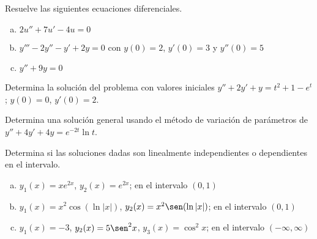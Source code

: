 \documentclass[12pt]{exam}
\begin{document}
\begin{questions}
     \question%
     Resuelve las siguientes ecuaciones diferenciales.
     \begin{enumerate}[a)]
         \item $2u''+7u'-4u=0$
         \item $y'''-2y''-y'+2y=0$ con $y(0)=2$, $y'(0)=3$ y $y''(0)=5$
         \item $y''+9y=0$
     \end{enumerate}

     \question%
     Determina la solución del problema con valores iniciales $y''+2y'+y=t^2+1-e^t$;  $y(0)=0$,  $y'(0)=2$.
     
     \question%
     Determina una solución general usando el método de variación de parámetros de $y''+4y'+4y=e^{-2t}\ln t$.

     \question%
     Determina si las soluciones dadas son linealmente independientes o dependientes en el intervalo.
     \begin{enumerate}[a)]
         \item $y_1(x)=xe^{2x}$, $y_2(x)=e^{2x}$; en el intervalo $(0,1)$
         \item $y_1(x)=x^2\cos(\ln|x|)$, $y_2(x)=x^2\sen(\ln|x|)$; en el intervalo $(0,1)$
         \item $y_1(x)=-3$, $y_2(x)=5\sen^2x$, $y_3(x)=\cos^2x$; en el intervalo $(-\infty,\infty)$
     \end{enumerate}



    \end{questions}
\end{document}
